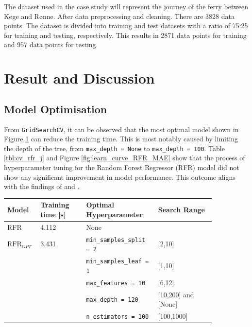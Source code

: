 \documentclass[]{interact}
\theoremstyle{plain}%
\theoremstyle{definition}
\theoremstyle{remark}
\begin{document}
The dataset used in the case study will represent the journey of the ferry between K{\o}ge and R{\o}nne. After data preprocessing and cleaning. There are 3828 data points. The dataset is divided into training and test datasets with a ratio of 75:25 for training and testing, respectively. This results in 2871 data points for training and 957 data points for testing.

\section{Result and Discussion}\label{sec:research_discussion_j}

\subsection{Model Optimisation}\label{sec:hpo_journal}

From \texttt{GridSearchCV}, it can be observed that the most optimal model shown in Figure \ref{tbl:hpo_optimal} can reduce the training time. This is most notably caused by limiting the depth of the tree, from \texttt{max\_depth = None} to \texttt{max\_depth = 100}. Table \ref{tbl:cv_rfr_j} and Figure \ref{fig:learn_curve_RFR_MAE} show that the process of hyperparameter tuning for the Random Forest Regressor (RFR) model did not show any significant improvement in model performance. This outcome aligns with the findings of \citet{Kuhn.2013} and \citet{Hastie.2009}.

\begin{table}
    {\begin{tabular}{ p{0.1\linewidth} p{0.2\linewidth}  p{0.3\linewidth} p{0.25\linewidth}}
    \hline
    Model & Training time [s] &  Optimal Hyperparameter & Search Range \\
    \hline
    RFR & 4.112 & None \\
    $\text{RFR}_{OPT}$ & 3.431  & {\tt min\_samples\_split = 2} & [2,10]\\
    &&{\tt min\_samples\_leaf = 1} & [1,10]\\
    &&{\tt max\_features = 10} & [6,12]\\
    &&{\tt max\_depth = 120} & [10,200] and [None]\\
    &&{\tt n\_estimators = 100} & [100,1000]\\
    \hline
    \end{tabular}}
  \label{tbl:hpo_optimal}
\end{table}
\end{document}
